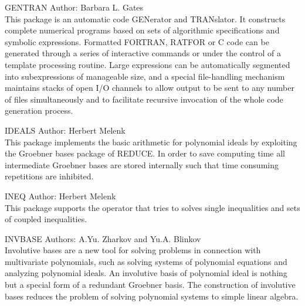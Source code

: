 \begin{Package}{GENTRAN}
Author: Barbara L. Gates\\

This package is an automatic code GENerator and TRANslator.  It constructs
complete numerical programs based on sets of algorithmic specifications and
symbolic expressions.  Formatted FORTRAN, RATFOR or C code can be generated
through a series of interactive commands or under the control of a template
processing routine.  Large expressions can be automatically segmented into
subexpressions of manageable size, and a special file-handling mechanism
maintains stacks of open I/O channels to allow output to be sent to any
number of files simultaneously and to facilitate recursive invocation of the
whole code generation process.
\end{Package}

\begin{Package}{IDEALS}
Author: Herbert Melenk\\

This package implements the basic arithmetic for polynomial ideals by
exploiting the Groebner bases package of REDUCE.  In order to save
computing time all intermediate Groebner bases are stored internally such
that time consuming repetitions are inhibited.
\end{Package}

\begin{Package}{INEQ}
Author: Herbert Melenk\\

This package supports the operator  that
tries to solves single inequalities and sets of coupled inequalities.
\end{Package}

\begin{Package}{INVBASE}
Authors: A.Yu. Zharkov and Yu.A. Blinkov\\

Involutive bases are a new tool for solving problems in connection with
multivariate polynomials, such as solving systems of polynomial equations
and analyzing polynomial ideals.  An involutive basis of polynomial ideal
is nothing but a special form of a redundant Groebner basis.  The
construction of involutive bases reduces the problem of solving polynomial
systems to simple linear algebra.
\end{Package}

